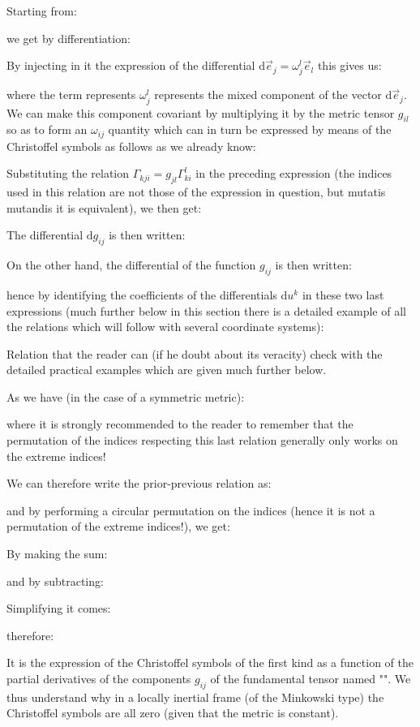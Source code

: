 	Starting from:
	
	we get by differentiation:
	
	By injecting in it the expression of the differential $\mathrm{d}\vec{e}_j=\omega_j^l\vec{e}_l$ this gives us:
	
	where the term represents $\omega_j^l$ represents the mixed component of the vector $\mathrm{d}\vec{e}_j$. We can make this component covariant by multiplying it by the metric tensor $g_{il}$ so as to form an $\omega_{ij}$ quantity which can in turn be expressed by means of the Christoffel symbols as follows as we already know:
	
	Substituting the relation $\Gamma_{kji}=g_{jl}\Gamma_{ki}^l$ in the preceding expression (the indices used in this relation are not those of the expression in question, but mutatis mutandis it is equivalent), we then get:
	
	The differential $\mathrm{d}g_{ij}$ is then written:
	
	On the other hand, the differential of the function $g_{ij}$ is then written:
	
	hence by identifying the coefficients of the differentials $\mathrm{d}u^k$ in these two last expressions (much further below in this section there is a detailed example of all the relations which will follow with several coordinate systems):
	
	Relation that the reader can (if he doubt about its veracity) check with the detailed practical examples which are given much further below.

	As we have (in the case of a symmetric metric):
	
	where it is strongly recommended to the reader to remember that the permutation of the indices respecting this last relation generally only  works on the extreme indices!

	We can therefore write the prior-previous relation as:
	
	and by performing a circular permutation on the indices (hence it is not a permutation of the extreme indices!), we get:
	
	By making the sum:
	
	and by subtracting:
	
	Simplifying it comes:
	
	therefore:
	
	It is the expression of the Christoffel symbols of the first kind as a function of the partial derivatives of the components $g_{ij}$ of the fundamental tensor named "\label{first Christoffel identity}". We thus understand why in a locally inertial frame (of the Minkowski type) the Christoffel symbols are all zero (given that the metric is constant).
	
